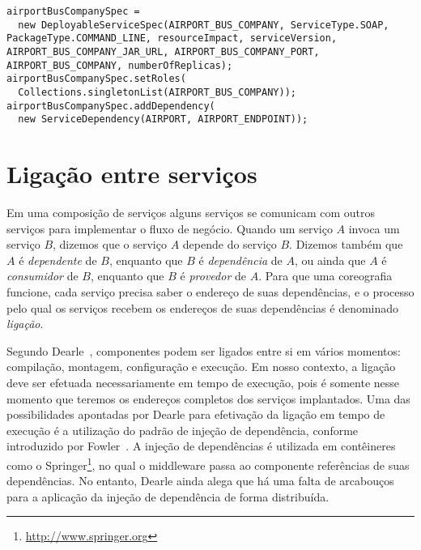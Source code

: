 \lstset{
language=Java,
}

{\scriptsize
\begin{lstlisting}[breaklines, caption={Trecho da especificação de uma coreografia.}, label={lst:service_spec}]
airportBusCompanySpec =
  new DeployableServiceSpec(AIRPORT_BUS_COMPANY, ServiceType.SOAP, PackageType.COMMAND_LINE, resourceImpact, serviceVersion, AIRPORT_BUS_COMPANY_JAR_URL, AIRPORT_BUS_COMPANY_PORT, AIRPORT_BUS_COMPANY, numberOfReplicas);
airportBusCompanySpec.setRoles(
  Collections.singletonList(AIRPORT_BUS_COMPANY));
airportBusCompanySpec.addDependency(
  new ServiceDependency(AIRPORT, AIRPORT_ENDPOINT));
\end{lstlisting}
}

\section{Ligação entre serviços}
\label{sec:ligacao}

Em uma composição de serviços alguns serviços se comunicam com outros serviços para implementar o fluxo de negócio.
Quando um serviço $A$ invoca um serviço $B$, dizemos que o serviço $A$ depende do serviço $B$. 
Dizemos também que $A$ é \emph{dependente} de $B$, enquanto que $B$ é \emph{dependência} de $A$,
ou ainda que $A$ é \emph{consumidor} de $B$, enquanto que $B$ é \emph{provedor} de $A$.
Para que uma coreografia funcione, cada serviço precisa saber o endereço de suas dependências,
e o processo pelo qual os serviços recebem os endereços de suas dependências é denominado \emph{ligação}.

Segundo Dearle~\cite{Dearle2007PastPresentFuture}, componentes podem ser ligados entre si em vários momentos: compilação, montagem, configuração e execução. Em nosso contexto, a ligação deve ser efetuada necessariamente em tempo de execução, pois é somente nesse momento que teremos os endereços completos dos serviços implantados. Uma das possibilidades apontadas por Dearle para efetivação da ligação em tempo de execução é a utilização do padrão de injeção de dependência, conforme introduzido por Fowler~\cite{Fowler2004Inversion}. A injeção de dependências é utilizada em contêineres como o Springer\footnote{\url{http://www.springer.org}}, no qual o middleware passa ao componente referências de suas dependências. No entanto, Dearle ainda alega que há uma falta de arcabouços para a aplicação da injeção de dependência de forma distribuída.

